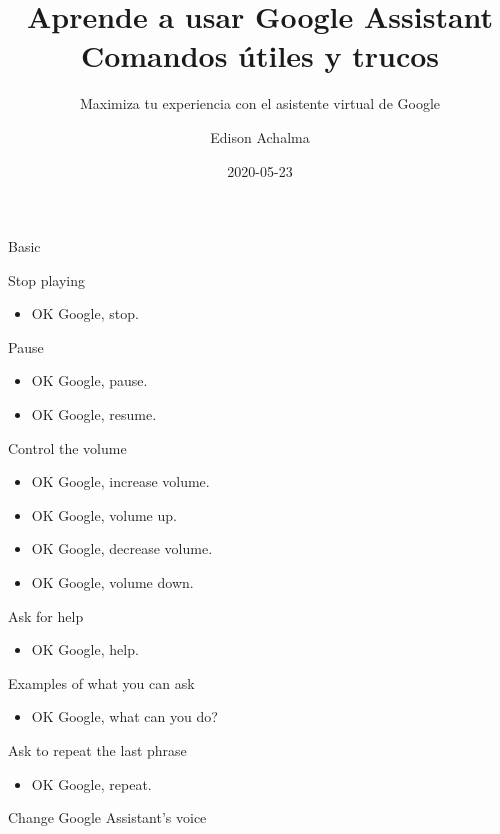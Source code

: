 \documentclass[
  a4paper,
]{article}
\title{Aprende a usar Google Assistant Comandos útiles y trucos}
\subtitle{Maximiza tu experiencia con el asistente virtual de Google}
\author{Edison Achalma}
\date{2020-05-23}
\providecommand{\tightlist}{%
  \setlength{\itemsep}{0pt}\setlength{\parskip}{0pt}}\usepackage{longtable,booktabs,array}
\begin{document}
\maketitle
\ifdefined\Shaded\renewenvironment{Shaded}{\begin{tcolorbox}[sharp corners, borderline west={3pt}{0pt}{shadecolor}, breakable, interior hidden, boxrule=0pt, enhanced, frame hidden]}{\end{tcolorbox}}\fi

Basic

Stop playing

\begin{itemize}
\tightlist
\item
  OK Google, stop.
\end{itemize}

Pause

\begin{itemize}
\tightlist
\item
  OK Google, pause.~
\item
  OK Google, resume.~
\end{itemize}

Control the volume

\begin{itemize}
\tightlist
\item
  OK Google, increase volume.~
\item
  OK Google, volume up.
\item
  OK Google, decrease volume.
\item
  OK Google, volume down.
\end{itemize}

Ask for help

\begin{itemize}
\tightlist
\item
  OK Google, help.
\end{itemize}

Examples of what you can ask

\begin{itemize}
\tightlist
\item
  OK Google, what can you do?
\end{itemize}

Ask to repeat the last phrase

\begin{itemize}
\tightlist
\item
  OK Google, repeat.
\end{itemize}

Change Google Assistant's voice
\end{document}
